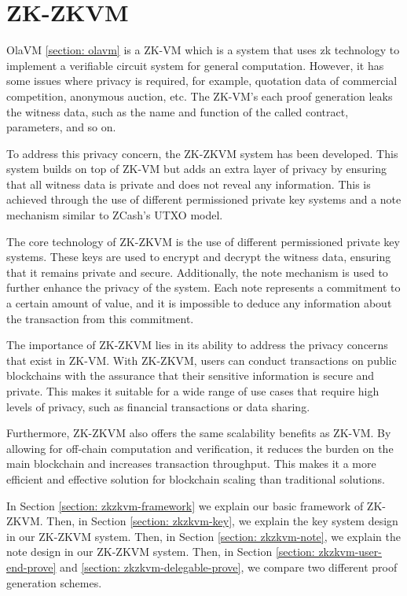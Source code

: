 \section{ZK-ZKVM} \label{sec:zkzkvm}

OlaVM \ref{section: olavm} is a ZK-VM which is a system that uses zk technology to implement a verifiable circuit system for general computation. However, it has some issues where privacy is required, for example, quotation data of commercial competition, anonymous auction, etc. The ZK-VM's each proof generation leaks the witness data, such as the name and function of the called contract, parameters, and so on.

To address this privacy concern, the ZK-ZKVM system has been developed. This system builds on top of ZK-VM but adds an extra layer of privacy by ensuring that all witness data is private and does not reveal any information. This is achieved through the use of different permissioned private key systems and a note mechanism similar to ZCash's UTXO model.

The core technology of ZK-ZKVM is the use of different permissioned private key systems. These keys are used to encrypt and decrypt the witness data, ensuring that it remains private and secure. Additionally, the note mechanism is used to further enhance the privacy of the system. Each note represents a commitment to a certain amount of value, and it is impossible to deduce any information about the transaction from this commitment.

The importance of ZK-ZKVM lies in its ability to address the privacy concerns that exist in ZK-VM. With ZK-ZKVM, users can conduct transactions on public blockchains with the assurance that their sensitive information is secure and private. This makes it suitable for a wide range of use cases that require high levels of privacy, such as financial transactions or data sharing.

Furthermore, ZK-ZKVM also offers the same scalability benefits as ZK-VM. By allowing for off-chain computation and verification, it reduces the burden on the main blockchain and increases transaction throughput. This makes it a more efficient and effective solution for blockchain scaling than traditional solutions.

In Section \ref{section: zkzkvm-framework} we explain our basic framework of ZK-ZKVM. Then, in Section \ref{section: zkzkvm-key}, we explain the key system design in our ZK-ZKVM system. Then, in Section \ref{section: zkzkvm-note}, we explain the note design in our ZK-ZKVM system. Then, in Section \ref{section: zkzkvm-user-end-prove} and \ref{section: zkzkvm-delegable-prove}, we compare two different proof generation schemes.





